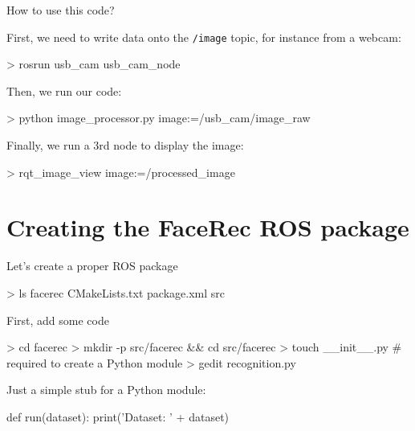 \documentclass[compress]{beamer}
\begin{document}
\begin{frame}[fragile]{How to use this code?}

First, we need to write data onto the \texttt{/image} topic, for instance from a
webcam:

\begin{shcode}
> rosrun usb_cam usb_cam_node
\end{shcode}

\pause

Then, we run our code:

\begin{shcode}
> python image_processor.py image:=/usb_cam/image_raw
\end{shcode}

\pause

Finally, we run a 3rd node to display the image:

\begin{shcode}
> rqt_image_view image:=/processed_image
\end{shcode}

\end{frame}


\section[]{Creating the FaceRec ROS package}

\begin{frame}[fragile]{Let's create a proper ROS package}

\pause
\begin{shcode}
> ls facerec
CMakeLists.txt  package.xml  src
\end{shcode}

\end{frame}

\begin{frame}[fragile]{First, add some code}

\begin{shcode}
> cd facerec
> mkdir -p src/facerec && cd src/facerec
> touch __init__.py # required to create a Python module
> gedit recognition.py
\end{shcode}
\pause

Just a simple stub for a Python module:

\begin{pythoncode}
def run(dataset):
    print('Dataset: ' + dataset)
\end{pythoncode}

\end{frame}
\end{document}
